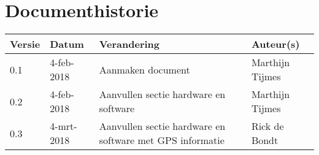 \section{Documenthistorie}

\begin{tabularx}{\textwidth}{| l | l | X | l |}
    \hline
    \textbf{Versie} & \textbf{Datum} & \textbf{Verandering} & \textbf{Auteur(s)}
    \\ \hline
    0.1	& 4-feb-2018 & Aanmaken document & Marthijn Tijmes \\ \hline
    0.2 & 4-feb-2018 & Aanvullen sectie hardware en software & Marthijn Tijmes \\ \hline
    0.3 & 4-mrt-2018 & Aanvullen sectie hardware en software met GPS informatie & Rick de Bondt \\ \hline

\end{tabularx}
